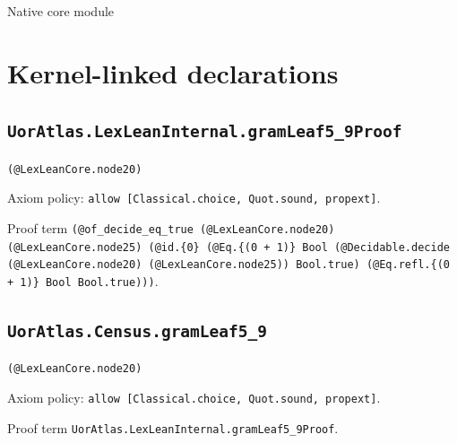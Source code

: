 \documentclass[11pt]{article}
\begin{document}
\begin{center}{\LARGE Native core module}\end{center}
\section*{Kernel-linked declarations}
\subsection*{\texttt{UorAtlas.LexLeanInternal.gramLeaf5\_9Proof}}
\noindent\texttt{(@LexLeanCore.node20)}\par
\noindent Axiom policy: \texttt{allow [Classical.choice, Quot.sound, propext]}.\par
\noindent Proof term \texttt{(@of\_decide\_eq\_true (@LexLeanCore.node20) (@LexLeanCore.node25) (@id.\{0\} (@Eq.\{(0 + 1)\} Bool (@Decidable.decide (@LexLeanCore.node20) (@LexLeanCore.node25)) Bool.true) (@Eq.refl.\{(0 + 1)\} Bool Bool.true)))}.\par
\subsection*{\texttt{UorAtlas.Census.gramLeaf5\_9}}
\noindent\texttt{(@LexLeanCore.node20)}\par
\noindent Axiom policy: \texttt{allow [Classical.choice, Quot.sound, propext]}.\par
\noindent Proof term \texttt{UorAtlas.LexLeanInternal.gramLeaf5\_9Proof}.\par
\end{document}
